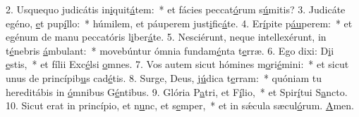 2. Usquequo judicátis in\uline{i}quit\uline{á}tem:~* et fácies peccat\uline{ó}rum s\uline{ú}mitis?
3. Judicáte egéno, \uline{e}t pup\uline{í}llo:~* húmilem, et páuperem just\uline{i}fic\uline{á}te.
4. Er\uline{í}pite p\uline{áu}perem:~* et egénum de manu peccatóris l\uline{i}ber\uline{á}te.
5. Nesciérunt, neque intellexérunt, in t\uline{é}nebris \uline{á}mbulant:~* movebúntur ómnia fundam\uline{é}nta t\uline{e}rræ.
6. Ego dixi: D\uline{i}i \uline{e}stis,~* et fílii Exc\uline{é}lsi \uline{o}mnes.
7. Vos autem sicut hómines m\uline{o}ri\uline{é}mini:~* et sicut unus de princípib\uline{u}s cad\uline{é}tis.
8. Surge, Deus, j\uline{ú}dica t\uline{e}rram:~* quóniam tu hereditábis in \uline{ó}mnibus G\uline{é}ntibus.
9. Glória P\uline{a}tri, et F\uline{í}lio,~* et Spir\uline{í}tui S\uline{a}ncto.
10. Sicut erat in princípio, et n\uline{u}nc, et s\uline{e}mper,~* et in sǽcula sæcul\uline{ó}rum. \uline{A}men.
